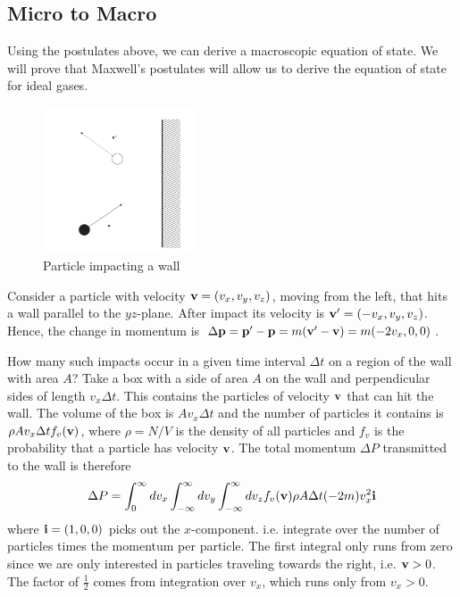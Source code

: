\subsection{Micro to Macro}
Using the postulates above, we can derive a macroscopic equation of state. We will prove that Maxwell's postulates will allow us to derive the equation of state for ideal gases.
\begin{figure}[H]
	\begin{center}
		\includegraphics[width=0.4\textwidth]{bouncyboi}
	\end{center}
	\caption{Particle impacting a wall}
\end{figure}
Consider a particle with velocity ${\bf v} = (v_x,v_y,v_z)$, moving from the left, that hits a wall parallel to the $yz$-plane. After impact its velocity is ${\bf v'}=(-v_x,v_y,v_z)$. Hence, the change in momentum is $\Delta {\bf p}= {\bf p'} - {\bf p} = m({\bf v'}-{\bf v}) = m(-2v_x,0,0)$.

How many such impacts occur in a given time interval $\Delta t$ on a region of the wall with area $A$? 
Take a box with a side of area $A$ on the wall and perpendicular sides of length $v_x\Delta t$. This contains the particles of velocity ${\bf v}$ that can hit the wall. The volume of the box is $Av_x\Delta t$ and the number of particles it contains is $\rho Av_x\Delta t f_v({\bf v})$, where $\rho=N/V$ is the density of all particles  and $f_v$ is the probability that a particle has velocity $\bf v$.
The total momentum $\Delta P$ transmitted to the wall is therefore
$$\Delta P =\int_0^\infty dv_x \int_{-\infty}^\infty dv_y \int_{-\infty}^\infty dv_z f_v({\bf v})\rho A\Delta t(-2m)v_x^2{\bf i}$$
where ${\bf i} =(1,0,0)$ picks out the $x$-component. i.e. integrate over the number of particles times the momentum per particle. The first integral only runs from zero since we are only interested in particles traveling towards the right, i.e. ${\bf v}>0$. The factor of $\frac{1}{2}$ comes from integration over $v_{x}$, which runs only from $v_{x} > 0$.

